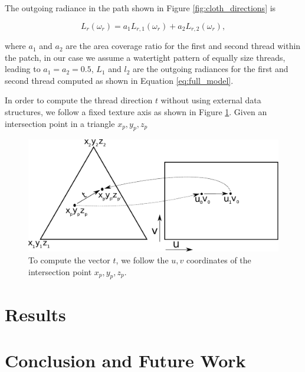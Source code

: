 \documentclass[12pt]{article}
\begin{document}
The outgoing radiance in the path shown in Figure \ref{fig:cloth_directions} is

\begin{equation}
L_r(\omega_r) = a_1 L_{r,1}(\omega_r) + a_2 L_{r,2}(\omega_r),
\end{equation}

where $a_1$ and $a_2$ are the area coverage ratio for the first and second thread within the patch, in our case we assume a watertight pattern of equally size threads, leading to $a_1 = a_2 = 0.5$, $L_1$ and $l_2$ are the outgoing radiances for the first and second thread computed as shown in Equation \ref{eq:full_model}.

In order to compute the thread direction $t$ without using external data structures, we follow a fixed texture axis as shown in Figure \ref{fig:thread_uv_coord}.
Given an intersection point in a triangle $x_p, y_p,z_p$

\begin{figure}[ht!]
\centering
\includegraphics[width=\textwidth]{images/thread_3d_coord}
	\caption{To compute the vector $t$, we follow the $u,v$ coordinates of the intersection point $x_p, y_p,z_p$.}
	\label{fig:thread_uv_coord}
\end{figure}

\section{Results}

\section{Conclusion and Future Work}



\end{document}

